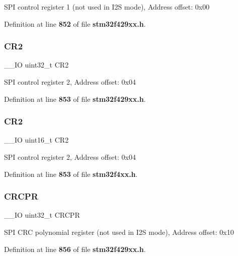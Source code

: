 S\+PI control register 1 (not used in I2S mode), Address offset\+: 0x00 

Definition at line \textbf{ 852} of file \textbf{ stm32f429xx.\+h}.

\mbox{\label{structSPI__TypeDef_afdfa307571967afb1d97943e982b6586}} 
\subsubsection{C\+R2\hspace{0.1cm}{\footnotesize\ttfamily [1/2]}}
{\footnotesize\ttfamily \+\_\+\+\_\+\+IO uint32\+\_\+t C\+R2}

S\+PI control register 2, Address offset\+: 0x04 

Definition at line \textbf{ 853} of file \textbf{ stm32f429xx.\+h}.

\mbox{\label{structSPI__TypeDef_a2a3e81bd118d1bc52d24a0b0772e6a0c}} 
\subsubsection{C\+R2\hspace{0.1cm}{\footnotesize\ttfamily [2/2]}}
{\footnotesize\ttfamily \+\_\+\+\_\+\+IO uint16\+\_\+t C\+R2}

S\+PI control register 2, Address offset\+: 0x04 

Definition at line \textbf{ 853} of file \textbf{ stm32f4xx.\+h}.

\mbox{\label{structSPI__TypeDef_ace450027b4b33f921dd8edd3425a717c}} 
\subsubsection{C\+R\+C\+PR\hspace{0.1cm}{\footnotesize\ttfamily [1/2]}}
{\footnotesize\ttfamily \+\_\+\+\_\+\+IO uint32\+\_\+t C\+R\+C\+PR}

S\+PI C\+RC polynomial register (not used in I2S mode), Address offset\+: 0x10 

Definition at line \textbf{ 856} of file \textbf{ stm32f429xx.\+h}.

